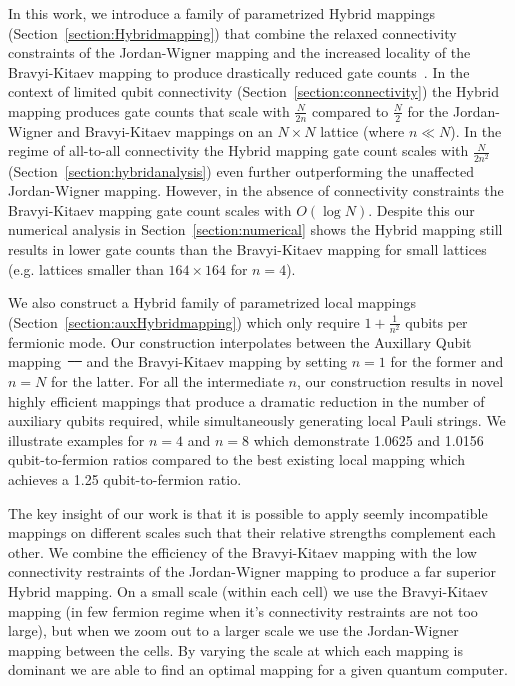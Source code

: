 \documentclass[pdftex,pra,aps,twocolumn,twoside]{revtex4-2}
\theoremstyle{plain}
\theoremstyle{note}
\newcommand\+{{\footnotesize \raisebox{0.3ex}{+}}}
\providecommand{\DIFaddtex}[1]{{\protect\color{blue}\uwave{#1}}} %
\providecommand{\DIFdeltex}[1]{{\protect\color{red}\sout{#1}}}                      %
\providecommand{\DIFaddbegin}{} %
\providecommand{\DIFaddend}{} %
\providecommand{\DIFdelbegin}{} %
\providecommand{\DIFdelend}{} %
\providecommand{\DIFadd}[1]{\texorpdfstring{\DIFaddtex{#1}}{#1}} %
\providecommand{\DIFdel}[1]{\texorpdfstring{\DIFdeltex{#1}}{}} %
\begin{document}
In this work, we introduce a family of parametrized Hybrid mappings (Section~\ref{section:Hybridmapping}) that combine the relaxed connectivity constraints of the Jordan-Wigner mapping and the increased locality of the Bravyi-Kitaev mapping to produce drastically reduced gate counts~\cite{tranter2018comparison}. In the context of limited qubit connectivity (Section~\ref{section:connectivity}) the Hybrid mapping produces gate counts that scale with $\frac{N}{2n}$ compared to $\frac{N}{2}$ for the Jordan-Wigner and Bravyi-Kitaev mappings on an $N\times N$ lattice (where $n \ll N$). In the regime of all-to-all connectivity the Hybrid mapping gate count scales with $\frac{N}{2n^2}$ (Section~\ref{section:hybridanalysis}) even further outperforming the unaffected Jordan-Wigner mapping. However, in the absence of connectivity constraints the Bravyi-Kitaev mapping gate count scales with $O(\log N)$. Despite this our numerical analysis in Section~\ref{section:numerical} shows the Hybrid mapping still results in lower gate counts than the Bravyi-Kitaev mapping for small lattices (e.g. lattices smaller than $164 \times 164$ for $n=4$).

We also construct a Hybrid\+ family of parametrized local mappings (Section~\ref{section:auxHybridmapping}) which only require $1+\frac{1}{n^2}$ qubits per fermionic mode. Our construction interpolates between the Auxillary Qubit mapping~\DIFdelbegin \DIFdel{\mbox{%
\cite{steudtner2019quantum} }\hskip0pt%
}\DIFdelend \DIFaddbegin \DIFadd{\mbox{%
\cite{Verstraete_2005, steudtner2019quantum} }\hskip0pt%
}\DIFaddend and the Bravyi-Kitaev mapping by setting $n=1$ for the former and $n=N$ for the latter. For all the intermediate $n$, our construction results in novel highly efficient mappings that produce a dramatic reduction in the number of auxiliary qubits required, while simultaneously generating local Pauli strings. We illustrate examples for $n=4$ and $n=8$ which demonstrate 1.0625 and 1.0156 qubit-to-fermion ratios compared to the best existing local mapping \cite{chen2022equivalence} which achieves a 1.25 qubit-to-fermion ratio.

The key insight of our work is that it is possible to apply seemly incompatible mappings on different scales such that their relative strengths complement each other. We combine the efficiency of the Bravyi-Kitaev mapping with the low connectivity restraints of the Jordan-Wigner mapping to produce a far superior Hybrid mapping. On a small scale (within each cell) we use the Bravyi-Kitaev mapping (in few fermion regime when it's connectivity restraints are not too large), but when we zoom out to a larger scale we use the Jordan-Wigner mapping between the cells. By varying the scale at which each mapping is dominant we are able to find an optimal mapping for a given quantum computer. 
\end{document}
